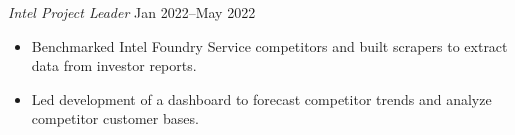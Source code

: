 \textit{Intel Project Leader} \hfill Jan 2022--May 2022
\begin{itemize}
	\item Benchmarked Intel Foundry Service competitors and built scrapers to extract data from investor reports.
	\item Led development of a dashboard to forecast competitor trends and analyze competitor customer bases.
\end{itemize}\par
